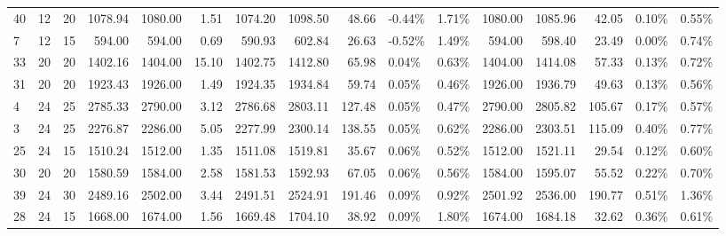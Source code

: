 \begin{tabular}{lllrrrrrrllrrrll}
40 &  12 &  20 &   1078.94 &    1080.00 &        1.51 &       1074.20 &        1098.50 &           48.66 &           -0.44\% &             1.71\% &       1080.00 &        1085.96 &           42.05 &            0.10\% &             0.55\% \\
7  &  12 &  15 &    594.00 &     594.00 &        0.69 &        590.93 &         602.84 &           26.63 &           -0.52\% &             1.49\% &        594.00 &         598.40 &           23.49 &            0.00\% &             0.74\% \\
33 &  20 &  20 &   1402.16 &    1404.00 &       15.10 &       1402.75 &        1412.80 &           65.98 &            0.04\% &             0.63\% &       1404.00 &        1414.08 &           57.33 &            0.13\% &             0.72\% \\
31 &  20 &  20 &   1923.43 &    1926.00 &        1.49 &       1924.35 &        1934.84 &           59.74 &            0.05\% &             0.46\% &       1926.00 &        1936.79 &           49.63 &            0.13\% &             0.56\% \\
4  &  24 &  25 &   2785.33 &    2790.00 &        3.12 &       2786.68 &        2803.11 &          127.48 &            0.05\% &             0.47\% &       2790.00 &        2805.82 &          105.67 &            0.17\% &             0.57\% \\
3  &  24 &  25 &   2276.87 &    2286.00 &        5.05 &       2277.99 &        2300.14 &          138.55 &            0.05\% &             0.62\% &       2286.00 &        2303.51 &          115.09 &            0.40\% &             0.77\% \\
25 &  24 &  15 &   1510.24 &    1512.00 &        1.35 &       1511.08 &        1519.81 &           35.67 &            0.06\% &             0.52\% &       1512.00 &        1521.11 &           29.54 &            0.12\% &             0.60\% \\
30 &  20 &  20 &   1580.59 &    1584.00 &        2.58 &       1581.53 &        1592.93 &           67.05 &            0.06\% &             0.56\% &       1584.00 &        1595.07 &           55.52 &            0.22\% &             0.70\% \\
39 &  24 &  30 &   2489.16 &    2502.00 &        3.44 &       2491.51 &        2524.91 &          191.46 &            0.09\% &             0.92\% &       2501.92 &        2536.00 &          190.77 &            0.51\% &             1.36\% \\
28 &  24 &  15 &   1668.00 &    1674.00 &        1.56 &       1669.48 &        1704.10 &           38.92 &            0.09\% &             1.80\% &       1674.00 &        1684.18 &           32.62 &            0.36\% &             0.61\% \\

\end{tabular}
